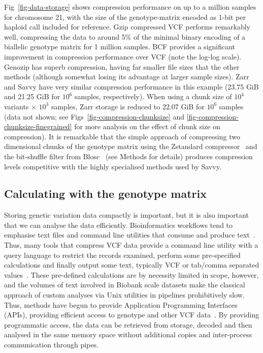 \documentclass[a4paper,num-refs]{oup-contemporary}
\begin{document}
Fig~\ref{fig-data-storage} shows compression performance
on up to a million samples for chromosome 21, with
the size of the genotype-matrix encoded as 1-bit per haploid
call included for reference.
Gzip compressed VCF performs remarkably well, compressing
the data to around 5\% of the
minimal binary encoding of a biallelic genotype matrix
for 1 million samples.
BCF provides a significant improvement in compression
performance over VCF (note the log-log scale). Genozip has
superb compression, having far smaller file sizes that the
other methods (although somewhat losing its advantage at
larger sample sizes). Zarr and Savvy have
very similar compression performance in this example (23.75 GiB
and 21.25 GiB for $10^6$ samples, respectively). When using
a chunk size of $10^4$ variants $\times$ $10^3$ samples, Zarr
storage is reduced to 22.07 GiB for $10^6$ samples (data not shown;
see Figs~\ref{fig-compression-chunksize} and \ref{fig-compression-chunksize-finegrained}
for more analysis on the effect of chunk size on compression).
It is remarkable that the simple approach of compressing
two dimensional chunks of the genotype matrix
using the Zstandard compressor~\citep{collet2021rfc} and the
bit-shuffle filter from Blosc~\cite{alted2010modern}
(see Methods for details) produces
compression levels competitive with the highly specialised methods
used by Savvy.

\subsection{Calculating with the genotype matrix}
Storing genetic variation data compactly is important, but it is also
important that we can analyse the data efficiently. Bioinformatics
workflows tend to emphasise text files and command line utilities
that consume and produce text~\citep[e.g.][]{buffalo2015bioinformatics}.
Thus, many tools that compress VCF data provide a command line
utility with a query language to restrict the records
examined, perform some pre-specified calculations and finally
output some text, typically VCF or tab/comma separated
values~\citep{
layer2016efficient, %
li2016bgt, %
danek2018gtc, %
lin2020sparse, %
lan2020genozip,lan2021genozip, %
zhang2023gbc}. %
These pre-defined calculations are by necessity limited in scope, however,
and the volumes of text involved in Biobank scale datasets
make the classical approach of custom
analyses via Unix utilities in pipelines prohibitively slow. Thus,
methods have begun to provide Application Programming Interfaces
(APIs), providing efficient access to genotype and other VCF
data~\cite[e.g.][]{kelleher2013processing,lefaive2021sparse,
wertenbroek2022xsi}. By providing programmatic access,
the data can be retrieved from storage, decoded and then analysed
in the same memory space without additional copies and
inter-process communication through pipes.
\end{document}
